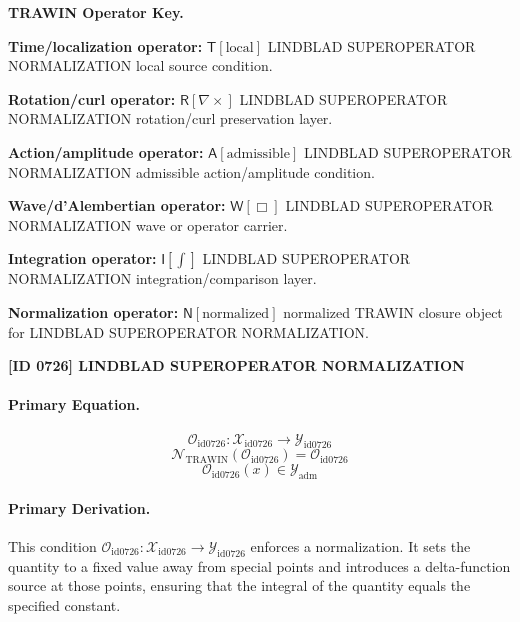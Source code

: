 \par\vspace{0.45\baselineskip}
\noindent\begin{minipage}[t]{\linewidth}
\begingroup
\small
\raggedright
\textbf{TRAWIN Operator Key.}\par
\noindent\textbf{Time/localization operator:} $\mathsf{T}\!\left[\mathrm{local}\right]$ LINDBLAD SUPEROPERATOR NORMALIZATION local source condition.\par
\noindent\textbf{Rotation/curl operator:} $\mathsf{R}\!\left[\nabla\times\right]$ LINDBLAD SUPEROPERATOR NORMALIZATION rotation/curl preservation layer.\par
\noindent\textbf{Action/amplitude operator:} $\mathsf{A}\!\left[\mathrm{admissible}\right]$ LINDBLAD SUPEROPERATOR NORMALIZATION admissible action/amplitude condition.\par
\noindent\textbf{Wave/d'Alembertian operator:} $\mathsf{W}\!\left[\Box\right]$ LINDBLAD SUPEROPERATOR NORMALIZATION wave or operator carrier.\par
\noindent\textbf{Integration operator:} $\mathsf{I}\!\left[\int\right]$ LINDBLAD SUPEROPERATOR NORMALIZATION integration/comparison layer.\par
\noindent\textbf{Normalization operator:} $\mathsf{N}\!\left[\mathrm{normalized}\right]$ normalized TRAWIN closure object for LINDBLAD SUPEROPERATOR NORMALIZATION.\par
\endgroup
\end{minipage}

\clearpage
\noindent\textbf{[ID 0726] LINDBLAD SUPEROPERATOR NORMALIZATION}\par
\vspace{0.35em}
\paragraph{Primary Equation.}
\[
\mathcal{O}_{\mathrm{id0726}}:\mathcal{X}_{\mathrm{id0726}}\longrightarrow\mathcal{Y}_{\mathrm{id0726}}
\]
\[
\mathcal{N}_{\mathrm{TRAWIN}}(\mathcal{O}_{\mathrm{id0726}})=\mathcal{O}_{\mathrm{id0726}}
\]
\[
\mathcal{O}_{\mathrm{id0726}}(x)\in\mathcal{Y}_{\mathrm{adm}}
\]

\paragraph{Primary Derivation.}
This condition \( \mathcal{O}_{\mathrm{id0726}}:\mathcal{X}_{\mathrm{id0726}}\longrightarrow\mathcal{Y}_{\mathrm{id0726}} \) enforces a normalization. It sets the quantity to a fixed value away from special points and introduces a delta-function source at those points, ensuring that the integral of the quantity equals the specified constant.
